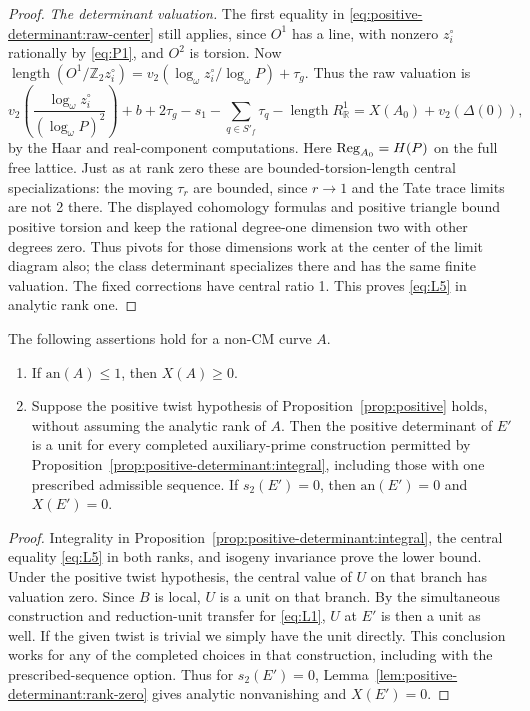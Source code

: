 \begin{proof}
\emph{The determinant valuation.}
The first equality in \eqref{eq:positive-determinant:raw-center} still applies, since \(O^1\) has a line, with nonzero \(z^\circ_i\) rationally by \eqref{eq:P1}, and \(O^2\) is torsion. Now \(\operatorname{length}(O^1/\mathbb Z_2 z^\circ_i)=v_2(\log_\omega z^\circ_i/\log_\omega P)+\tau_g\). Thus the raw valuation is
\[
 v_2\!\left(\frac{\log_\omega z^\circ_i}{(\log_\omega P)^2}\right)
            +b+2\tau_g-s_1-\sum_{q\in S'_f}\tau_q
                             -\operatorname{length}R^1_\mathbb R
       = X(A_0)+v_2(\Delta(0)),
\]
by the Haar and real-component computations. Here \({\rm Reg}_{A_0}=H(P)\) on the full free lattice. Just as at rank zero these are bounded-torsion-length central specializations: the moving \(\tau_r\) are bounded, since \(r\to1\) and the Tate trace limits are not 2 there. The displayed cohomology formulas and positive triangle bound positive torsion and keep the rational degree-one dimension two with other degrees zero. Thus pivots for those dimensions work at the center of the limit diagram also; the class determinant specializes there and has the same finite valuation. The fixed corrections have central ratio 1. This proves \eqref{eq:L5} in analytic rank one.
\end{proof}

\begin{corollary}\label{cor:positive-completion:unit}
The following assertions hold for a non-CM curve \(A\).
\begin{enumerate}[label=(\roman*)]
\item If \(\mathrm{an}(A)\le1\), then \(X(A)\ge0\).
\item Suppose the positive twist hypothesis of Proposition~\ref{prop:positive}
holds, without assuming the analytic rank of \(A\). Then the positive
determinant of \(E'\) is a unit for every completed auxiliary-prime
construction permitted by Proposition~\ref{prop:positive-determinant:integral},
including those with one prescribed admissible sequence. If \(s_2(E')=0\),
then \(\mathrm{an}(E')=0\) and \(X(E')=0\).
\end{enumerate}
\end{corollary}
\begin{proof}
Integrality in Proposition~\ref{prop:positive-determinant:integral}, the
central equality \eqref{eq:L5} in both ranks, and isogeny invariance prove
the lower bound. Under the positive twist hypothesis, the central value of
\(U\) on that branch has valuation zero. Since \(B\) is local, \(U\) is
a unit on that branch. By the simultaneous construction and reduction-unit transfer for \eqref{eq:L1}, \(U\) at \(E'\) is then a unit as well. If the given twist is trivial we simply have the unit directly. This conclusion works for any of the completed choices in that construction, including with the prescribed-sequence option. Thus for \(s_2(E')=0\), Lemma~\ref{lem:positive-determinant:rank-zero} gives analytic
nonvanishing and \(X(E')=0\).
\end{proof}

